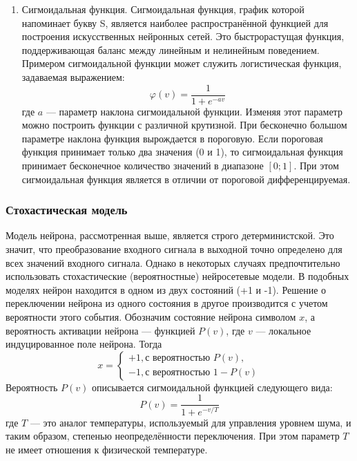 \begin{enumerate}
\begin{itemize}
\end{itemize}
\item Сигмоидальная функция. 
Сигмоидальная функция, график которой напоминает букву S, является наиболее распространённой функцией для построения искусственных нейронных сетей.
Это быстрорастущая функция, поддерживающая баланс между линейным и нелинейным поведением.
Примером сигмоидальной функции может служить логистическая функция, задаваемая выражением:
\begin{equation}
\varphi(v) = \frac1{1+e^{-av}}
\end{equation}
где $a$ --- параметр наклона сигмоидальной функции.
Изменяя этот параметр можно построить функции с различной крутизной.
При бесконечно большом параметре наклона функция вырождается в пороговую.
Если пороговая функция принимает только два значения (0 и 1), то сигмоидальная функция принимает бесконечное количество значений в диапазоне $[0;1]$.
При этом сигмоидальная функция является в отличии от пороговой дифференцируемая.\cite{NejronnyeSeti}
\end{enumerate}
\subsubsection{Стохастическая модель}
Модель нейрона, рассмотренная выше, является строго детерминистской.
Это значит, что преобразование входного сигнала в выходной точно определено для всех значений входного сигнала.
Однако в некоторых случаях предпочтительно использовать стохастические (вероятностные) нейросетевые модели.
В подобных моделях нейрон находится в одном из двух состояний (+1 и -1).
Решение о переключении нейрона из одного состояния в другое производится с учетом вероятности этого события.
Обозначим состояние нейрона символом $x$, а вероятность активации нейрона --- функцией $P(v)$, где $v$ --- локальное индуцированное поле нейрона.
Тогда
\begin{equation}
x=
\begin{cases}
+1, \text{с вероятностью } P(v),\\
-1, \text{с вероятностью } 1-P(v)
\end{cases}
\end{equation}
Вероятность $P(v)$ описывается сигмоидальной функцией следующего вида:
\begin{equation}
P(v) = \frac1{1 + e^{- v/T}}
\end{equation}
где $T$ --- это аналог температуры, используемый для управления уровнем шума, и таким образом, степенью неопределённости переключения.
При этом параметр $T$ не имеет отношения к физической температуре. \cite{NejronnyeSeti}